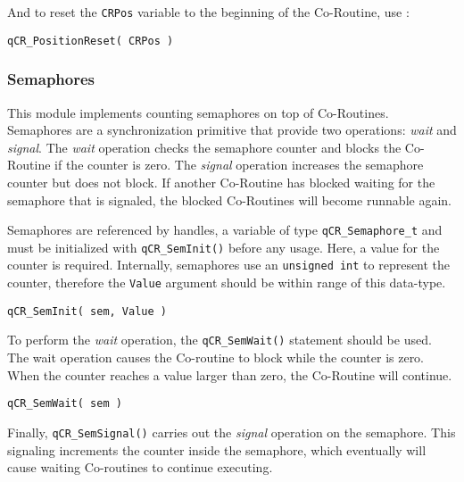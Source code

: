 And to reset the \lstinline{CRPos} variable to the beginning of the Co-Routine, use :

\begin{lstlisting}[style=CStyle]
qCR_PositionReset( CRPos )
\end{lstlisting}

\subsubsection{Semaphores}
This module implements counting semaphores on top of Co-Routines. Semaphores are a synchronization primitive that provide two operations: \textit{wait} and \textit{signal}. The \textit{wait} operation checks the semaphore counter and blocks the Co-Routine if the counter is zero. The \textit{signal} operation increases the semaphore counter but does not block. If another Co-Routine has blocked waiting for the semaphore that is signaled, the blocked Co-Routines will become runnable again.

Semaphores are referenced by handles, a variable of type \lstinline{qCR_Semaphore_t} and must be initialized with \lstinline{qCR_SemInit()}  before any usage.  Here, a value for the counter is required. Internally, semaphores use an \lstinline{unsigned int} to represent the counter, therefore the \lstinline{Value} argument should be within range of this data-type. \\

\begin{lstlisting}[style=CStyle]
qCR_SemInit( sem, Value )
\end{lstlisting}

To perform the \textit{wait} operation, the \lstinline{qCR_SemWait()}  statement should be used. The wait operation causes the Co-routine to block while the counter is zero. When the counter reaches a value larger than zero, the Co-Routine will continue. \\


\begin{lstlisting}[style=CStyle]
qCR_SemWait( sem )
\end{lstlisting}

Finally, \lstinline{qCR_SemSignal()}  carries out the \textit{signal} operation on the semaphore. This signaling increments the counter inside the semaphore, which eventually will cause waiting Co-routines to continue executing. \\

